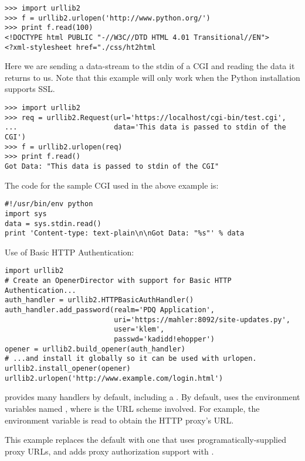 \begin{verbatim}
>>> import urllib2
>>> f = urllib2.urlopen('http://www.python.org/')
>>> print f.read(100)
<!DOCTYPE html PUBLIC "-//W3C//DTD HTML 4.01 Transitional//EN">
<?xml-stylesheet href="./css/ht2html
\end{verbatim}

Here we are sending a data-stream to the stdin of a CGI and reading
the data it returns to us. Note that this example will only work when the
Python installation supports SSL.

\begin{verbatim}
>>> import urllib2
>>> req = urllib2.Request(url='https://localhost/cgi-bin/test.cgi',
...                       data='This data is passed to stdin of the CGI')
>>> f = urllib2.urlopen(req)
>>> print f.read()
Got Data: "This data is passed to stdin of the CGI"
\end{verbatim}

The code for the sample CGI used in the above example is:

\begin{verbatim}
#!/usr/bin/env python
import sys
data = sys.stdin.read()
print 'Content-type: text-plain\n\nGot Data: "%s"' % data
\end{verbatim}


Use of Basic HTTP Authentication:

\begin{verbatim}
import urllib2
# Create an OpenerDirector with support for Basic HTTP Authentication...
auth_handler = urllib2.HTTPBasicAuthHandler()
auth_handler.add_password(realm='PDQ Application',
                          uri='https://mahler:8092/site-updates.py',
                          user='klem',
                          passwd='kadidd!ehopper')
opener = urllib2.build_opener(auth_handler)
# ...and install it globally so it can be used with urlopen.
urllib2.install_opener(opener)
urllib2.urlopen('http://www.example.com/login.html')
\end{verbatim}

 provides many handlers by default, including a
.  By default,  uses the
environment variables named , where 
is the URL scheme involved.  For example, the 
environment variable is read to obtain the HTTP proxy's URL.

This example replaces the default  with one that uses
programatically-supplied proxy URLs, and adds proxy authorization support
with .

